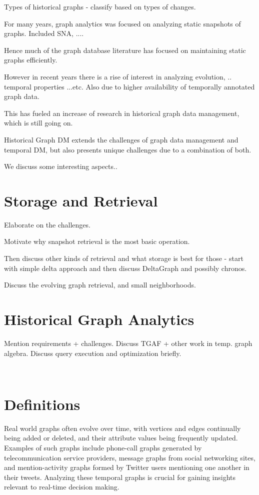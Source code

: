 \documentclass{svjour3}
\begin{document}
Types of historical graphs - classify based on types of changes.


 
For many years, graph analytics was focused on analyzing static snapshots of graphs. Included SNA, ....

Hence much of the graph database literature has focused on maintaining static graphs efficiently. 

However in recent years there is a rise of interest in analyzing evolution, .. temporal properties ...etc. Also due to higher availability of temporally annotated graph data.

This has fueled an increase of research in historical graph data management, which is still going on. 

Historical Graph DM extends the challenges of graph data management and temporal DM, but also presents unique challenges due to a combination of both. 

We discuss some interesting aspects..



\section{Storage and Retrieval}
Elaborate on the challenges.

Motivate why snapshot retrieval is the most basic operation. 

Then discuss other kinds of retrieval and what storage is best for those - start with simple delta approach and then discuss DeltaGraph and possibly chronos.

Discuss the evolving graph retrieval, and small neighborhoods.

\section{Historical Graph Analytics}
Mention requirements + challenges.
Discuss TGAF + other work in temp. graph algebra. Discuss query execution and optimization briefly. 

~\cite{khurana2013efficient}~\cite{macko2015llama}~\cite{han2014chronos}~\cite{khurana2016storing}

\section{}

\section{Definitions}
Real world graphs often evolve over time, with vertices and edges continually being added or deleted, and their attribute values being frequently updated. Examples of such graphs include phone-call graphs generated by telecommunication service providers, message graphs from social networking sites, and mention-activity graphs formed by Twitter users mentioning one another in their tweets. Analyzing these temporal graphs is crucial for gaining insights relevant to real-time decision making.
\end{document}
